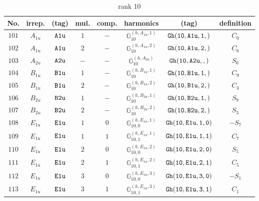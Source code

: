 \documentclass[fleqn,8pt]{jsarticle}
\begin{document}
\begin{table}[ht!]
\begin{center}
\caption{rank 10}
\renewcommand{\arraystretch}{1.3}
\begin{tabular}{cccccccc} \hline \hline
No. & irrep. & (tag) & mul. & comp. & harmonics & (tag) & definition \\ \hline
$ 101 $ & $ A_{1u} $ & $ {\tt A1u} $ & $ 1 $ & $ - $ & $ \mathbb{G}_{10}^{(h,A_{1u},1)} $ & $ {\tt Gh(10,A1u,1,)} $ & $ C_{0} $ \\
$ 102 $ & $ A_{1u} $ & $ {\tt A1u} $ & $ 2 $ & $ - $ & $ \mathbb{G}_{10}^{(h,A_{1u},2)} $ & $ {\tt Gh(10,A1u,2,)} $ & $ C_{6} $ \\
$ 103 $ & $ A_{2u} $ & $ {\tt A2u} $ & $ - $ & $ - $ & $ \mathbb{G}_{10}^{(h,A_{2u})} $ & $ {\tt Gh(10,A2u,,)} $ & $ S_{6} $ \\
$ 104 $ & $ B_{1u} $ & $ {\tt B1u} $ & $ 1 $ & $ - $ & $ \mathbb{G}_{10}^{(h,B_{1u},1)} $ & $ {\tt Gh(10,B1u,1,)} $ & $ C_{9} $ \\
$ 105 $ & $ B_{1u} $ & $ {\tt B1u} $ & $ 2 $ & $ - $ & $ \mathbb{G}_{10}^{(h,B_{1u},2)} $ & $ {\tt Gh(10,B1u,2,)} $ & $ C_{3} $ \\
$ 106 $ & $ B_{2u} $ & $ {\tt B2u} $ & $ 1 $ & $ - $ & $ \mathbb{G}_{10}^{(h,B_{2u},1)} $ & $ {\tt Gh(10,B2u,1,)} $ & $ S_{9} $ \\
$ 107 $ & $ B_{2u} $ & $ {\tt B2u} $ & $ 2 $ & $ - $ & $ \mathbb{G}_{10}^{(h,B_{2u},2)} $ & $ {\tt Gh(10,B2u,2,)} $ & $ S_{3} $ \\
$ 108 $ & $ E_{1u} $ & $ {\tt E1u} $ & $ 1 $ & $ 0 $ & $ \mathbb{G}_{10,0}^{(h,E_{1u},1)} $ & $ {\tt Gh(10,E1u,1,0)} $ & $ - S_{7} $ \\
$ 109 $ & $ E_{1u} $ & $ {\tt E1u} $ & $ 1 $ & $ 1 $ & $ \mathbb{G}_{10,1}^{(h,E_{1u},1)} $ & $ {\tt Gh(10,E1u,1,1)} $ & $ C_{7} $ \\
$ 110 $ & $ E_{1u} $ & $ {\tt E1u} $ & $ 2 $ & $ 0 $ & $ \mathbb{G}_{10,0}^{(h,E_{1u},2)} $ & $ {\tt Gh(10,E1u,2,0)} $ & $ S_{5} $ \\
$ 111 $ & $ E_{1u} $ & $ {\tt E1u} $ & $ 2 $ & $ 1 $ & $ \mathbb{G}_{10,1}^{(h,E_{1u},2)} $ & $ {\tt Gh(10,E1u,2,1)} $ & $ C_{5} $ \\
$ 112 $ & $ E_{1u} $ & $ {\tt E1u} $ & $ 3 $ & $ 0 $ & $ \mathbb{G}_{10,0}^{(h,E_{1u},3)} $ & $ {\tt Gh(10,E1u,3,0)} $ & $ - S_{1} $ \\
$ 113 $ & $ E_{1u} $ & $ {\tt E1u} $ & $ 3 $ & $ 1 $ & $ \mathbb{G}_{10,1}^{(h,E_{1u},3)} $ & $ {\tt Gh(10,E1u,3,1)} $ & $ C_{1} $ \\

\end{tabular}
\end{center}
\end{table}
\end{document}
